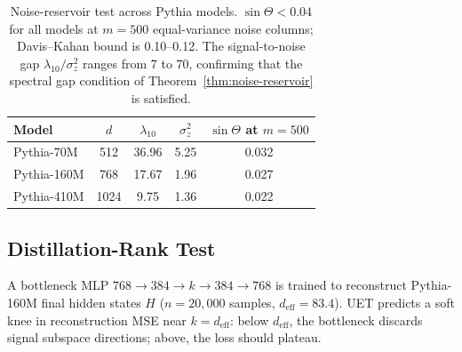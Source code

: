 \documentclass[10pt]{article}
\newcommand{\deff}{d_{\mathrm{eff}}}
\newcommand{\sinT}{\sin\Theta}
\theoremstyle{plain}
\theoremstyle{definition}
\theoremstyle{remark}
\begin{document}
\begin{table}[H]
\centering\small
\begin{tabular}{lSSSS}
\toprule
Model & {$d$} & {$\lambda_{10}$} & {$\sigma_z^2$} &
        {$\sinT$ at $m=500$} \\
\midrule
Pythia-70M  & 512 & 36.96 & 5.25 & 0.032 \\
Pythia-160M & 768 & 17.67 & 1.96 & 0.027 \\
Pythia-410M & 1024 & 9.75 & 1.36 & 0.022 \\
\bottomrule
\end{tabular}
\caption{Noise-reservoir test across Pythia models.
$\sinT < 0.04$ for all models at $m=500$ equal-variance noise columns;
Davis--Kahan bound is 0.10--0.12.
The signal-to-noise gap $\lambda_{10}/\sigma_z^2$ ranges from 7 to 70,
confirming that the spectral gap condition of
Theorem~\ref{thm:noise-reservoir} is satisfied.}
\label{tab:nr}
\end{table}

\subsection{Distillation-Rank Test}

A bottleneck MLP $768 \to 384 \to k \to 384 \to 768$ is trained to
reconstruct Pythia-160M final hidden states $H$ ($n=20{,}000$ samples,
$\deff = 83.4$).
UET predicts a soft knee in reconstruction MSE near $k = \deff$:
below $\deff$, the bottleneck discards signal subspace directions; above,
the loss should plateau.
\end{document}
